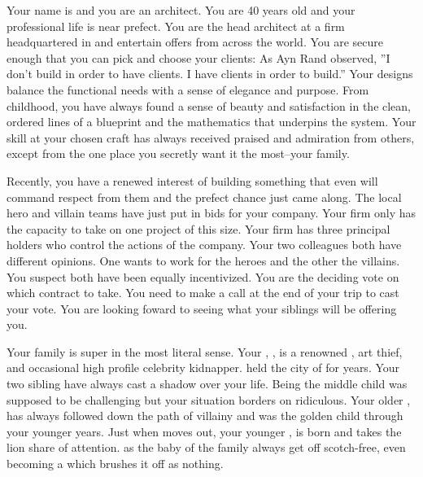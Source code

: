 \documentclass[char]{LRSguildcamp1}
\begin{document}
\name{\cArchitect{}}


Your name is \cArchitect{\intro} and you are an architect. You are 40 years old and your professional life is near prefect. You are the head architect at a firm headquartered in \pCityArchitect{} and entertain offers from across the world.  You are secure enough that you can pick and choose your clients: As Ayn Rand observed, ''I don't build in order to have clients. I have clients in order to build.'' Your designs balance the functional needs with a sense of elegance and purpose. From childhood, you have always found a sense of beauty and satisfaction in the clean, ordered lines of a blueprint and the mathematics that underpins the system. Your skill at your chosen craft has always received praised and admiration from others, except from the one place you secretly want it the most--your family. 

Recently, you have a renewed interest of building something that even will command respect from them and the prefect chance just came along. The local hero and villain teams \pCityArchitect{} have just put in bids for your company. Your firm only has the capacity to take on one project of this size. Your firm has three principal holders who control the actions of the company. Your two colleagues both have different opinions. One wants to work for the heroes and the other the villains. You suspect both have been equally incentivized. You are the deciding vote on which contract to take. You need to make a call at the end of your trip to cast your vote. You are looking foward to seeing what your siblings will be offering you.  

Your family is super in the most literal sense. Your \cGrandma{\parent}, \cGrandma{}, is a renowned \cGrandma{\villain}, art thief, and occasional high profile celebrity kidnapper. \cGrandma{\Theyhave} held the city of \pCityGrandma{} for years. Your two sibling have always cast a shadow over your life. Being the middle child was supposed to be challenging but your situation borders on ridiculous. Your older \cOldest{\sibling}, \cOldest{} has always followed \cGrandma{} down the path of villainy and was the golden child through your younger years. Just when \cOldest{} moves out, your younger \cYoungest{\sibling}, \cYoungest{} is born and takes the lion share of attention. \cYoungest{\They} as the baby of the family always get off scotch-free, even becoming a \cYoungest{\hero} which \cGrandma{} brushes it off as nothing. 
\end{document}
